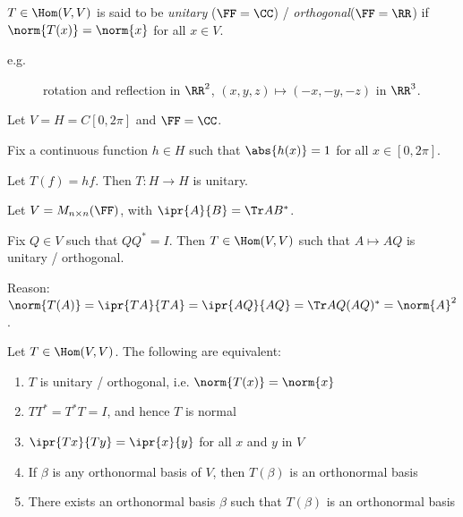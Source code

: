 \documentclass[11pt]{scrartcl}
\begin{document}
  \begin{definition}
    $T \in \Hom(V,V)$ is said to be \textit{unitary} ($\FF=\CC$) / \textit{orthogonal}($\FF = \RR$) if $\norm{T(x)}=\norm{x}$ for all $x\in V$.
  \end{definition}

  \begin{description}

  \item[e.g.] rotation and reflection in $\RR^{2}$, $(x, y, z)\mapsto (-x, -y, -z)$ in $\RR^3$.

  \end{description}

  \begin{example}

    Let $V = H = C[0, 2\pi]$ and $\FF=\CC$.

    Fix a continuous function $h\in H$ such that $\abs{h(x)}=1$ for all $x\in[0, 2\pi]$.

    Let $T(f) = hf$. Then $T: H \to H$ is unitary.

  \end{example}
  \begin{example}

    Let $V = M_{n\times n}(\FF)$, with $\ipr{A}{B} = \Tr AB^{*}$.

    Fix $Q\in V$ such that $Q Q^{*} = I$. Then $T \in \Hom(V,V)$ such that $A \mapsto AQ$ is unitary / orthogonal.

    Reason: $\norm{T(A)} = \ipr{TA}{TA} = \ipr{AQ}{AQ} = \Tr AQ(AQ)^{*} = \norm{A}^2$.

  \end{example}

  \begin{theorem}
    \label{sec:unit-orth-transf-1}
    Let $T \in \Hom(V,V)$. The following are equivalent:

    \begin{enumerate}[label=\alph*)]
    \item $T$ is unitary / orthogonal, i.e. $\norm{T(x)} = \norm{x}$
    \item $TT^{*} = T^{*}T = I$, and hence $T$ is normal
    \item $\ipr{Tx}{Ty}=\ipr{x}{y}$ for all $x$ and $y$ in $V$
    \item If $\beta$  is any orthonormal basis of $V$, then $T(\beta)$ is an orthonormal basis
    \item There exists an orthonormal basis $\beta$ such that $T(\beta)$ is an orthonormal basis
    \end{enumerate}
  \end{theorem}
\end{document}
